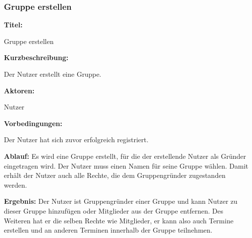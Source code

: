 \documentclass{scrartcl}
\begin{document}
	\newpage
	
	\subsubsection{Gruppe erstellen}
	\begin{description}
		\item \textbf{Titel:}
		\begin{description}
			\item Gruppe erstellen
		\end{description}
		\item \textbf{Kurzbeschreibung:}
		\begin{description}
			\item Der Nutzer erstellt eine Gruppe.
		\end{description}
		\item \textbf{Aktoren:}
		\begin{description}
			\item Nutzer 
		\end{description}
		\item \textbf{Vorbedingungen:}
		\begin{description}
			\item Der Nutzer hat sich zuvor erfolgreich registriert.
		\end{description}
		\item \textbf{Ablauf:} \newline Es wird eine Gruppe erstellt, für die der erstellende Nutzer als Gründer eingetragen wird. Der Nutzer muss einen Namen für seine Gruppe wählen. Damit erhält der Nutzer auch alle Rechte, die dem Gruppengründer zugestanden werden. 
		\item \textbf{Ergebnis:} \newline Der Nutzer ist Gruppengründer einer Gruppe und kann Nutzer zu dieser Gruppe hinzufügen oder Mitglieder aus der Gruppe entfernen. Des Weiteren hat er die selben Rechte wie Mitglieder, er kann also auch Termine erstellen und an anderen Terminen innerhalb der Gruppe teilnehmen.
	\end{description}
	
	\newpage
	
\end{document}

